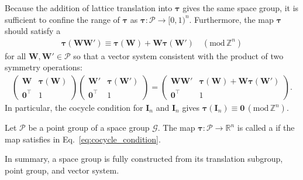 Because the addition of lattice translation into $\bm{\tau}$ gives the same space group, it is sufficient to confine the range of $\bm{\tau}$ as $\bm{\tau}: \mathcal{P} \to [0, 1)^{n}$.
Furthermore, the map $\bm{\tau}$ should satisfy a 
\begin{align}
  \label{eq:cocycle_condition}
  \bm{\tau}(\bm{W}\bm{W}') \equiv \bm{\tau}(\bm{W}) + \bm{W} \bm{\tau}(\bm{W}') \quad ( \mathrm{mod} \, \mathbb{Z}^{n})
\end{align}
for all $\bm{W}, \bm{W}' \in \mathcal{P}$ so that a vector system consistent with the product of two symmetry operations:
\begin{align*}
  \begin{pmatrix}
    \bm{W} & \bm{\tau}(\bm{W}) \\
    \bm{0}^{\top} & 1
  \end{pmatrix}
  \begin{pmatrix}
    \bm{W}' & \bm{\tau}(\bm{W}') \\
    \bm{0}^{\top} & 1
  \end{pmatrix}
  =
  \begin{pmatrix}
    \bm{W}\bm{W}' & \bm{\tau}(\bm{W}) + \bm{W} \bm{\tau}(\bm{W}') \\
    \bm{0}^{\top} & 1
  \end{pmatrix}.
\end{align*}
In particular, the cocycle condition for $\bm{I}_{n}$ and $\bm{I}_{n}$ gives $\bm{\tau}(\bm{I}_{n}) \equiv \bm{0} \, (\mathrm{mod}\, \mathbb{Z}^{n})$.

\begin{screen}
  \begin{defn}
    Let $\mathcal{P}$ be a point group of a space group $\mathcal{G}$.
    The map $\bm{\tau}: \mathcal{P} \to \mathbb{R}^{n}$ is called a  if the map satisfies  in Eq.~\eqref{eq:cocycle_condition}.
  \end{defn}
\end{screen}
In summary, a space group is fully constructed from its translation subgroup, point group, and vector system.

